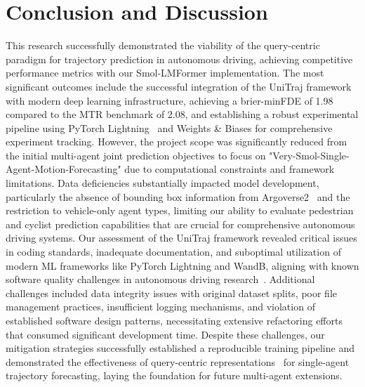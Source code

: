 \section{Conclusion and Discussion}
\label{ch:conclusion_future}
This research successfully demonstrated the viability of the query-centric paradigm for trajectory prediction in autonomous driving, achieving competitive performance metrics with our Smol-LMFormer implementation. The most significant outcomes include the successful integration of the UniTraj framework~\cite{unitrajFeng2024} with modern deep learning infrastructure, achieving a brier-minFDE of 1.98 compared to the MTR benchmark of 2.08, and establishing a robust experimental pipeline using PyTorch Lightning~\cite{falcon2019pytorch} and Weights \& Biases for comprehensive experiment tracking. However, the project scope was significantly reduced from the initial multi-agent joint prediction objectives to focus on "Very-Smol-Single-Agent-Motion-Forecasting" due to computational constraints and framework limitations. Data deficiencies substantially impacted model development, particularly the absence of bounding box information from Argoverse2~\cite{av2Wilson2023} and the restriction to vehicle-only agent types, limiting our ability to evaluate pedestrian and cyclist prediction capabilities that are crucial for comprehensive autonomous driving systems. Our assessment of the UniTraj framework revealed critical issues in coding standards, inadequate documentation, and suboptimal utilization of modern ML frameworks like PyTorch Lightning and WandB, aligning with known software quality challenges in autonomous driving research~\cite{metadriveLi2022}. Additional challenges included data integrity issues with original dataset splits, poor file management practices, insufficient logging mechanisms, and violation of established software design patterns, necessitating extensive refactoring efforts that consumed significant development time. Despite these challenges, our mitigation strategies successfully established a reproducible training pipeline and demonstrated the effectiveness of query-centric representations~\cite{qcnetZhou2023} for single-agent trajectory forecasting, laying the foundation for future multi-agent extensions.

